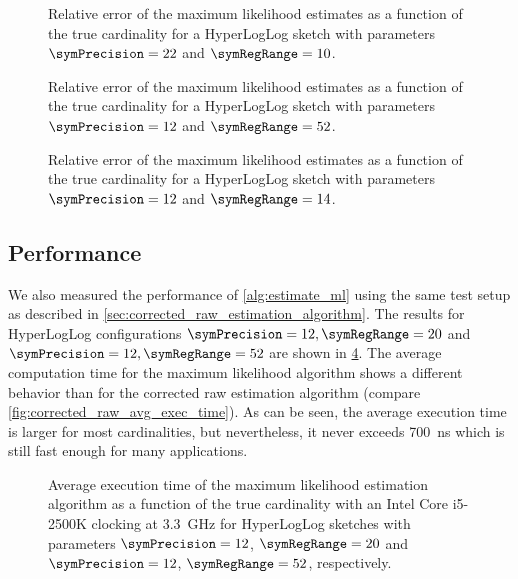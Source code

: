 \documentclass[a4paper]{scrartcl}
\begin{document}
\begin{figure}
\centering

\caption{Relative error of the maximum likelihood estimates as a function of the true cardinality for a HyperLogLog sketch with parameters $\symPrecision = 22$ and $\symRegRange=10$.}
\label{fig:max_likelihood_estimation_error_22_10}
\end{figure}

\begin{figure}
\centering

\caption{Relative error of the maximum likelihood estimates as a function of the true cardinality for a HyperLogLog sketch with parameters $\symPrecision = 12$ and $\symRegRange=52$.}
\label{fig:max_likelihood_estimation_error_12_52}
\end{figure}

\begin{figure}
\centering

\caption{Relative error of the maximum likelihood estimates as a function of the true cardinality for a HyperLogLog sketch with parameters $\symPrecision = 12$ and $\symRegRange=14$.}
\label{fig:max_likelihood_estimation_error_12_14}
\end{figure}

\subsection{Performance}
We also measured the performance of \cref{alg:estimate_ml} using the same test setup as described in \cref{sec:corrected_raw_estimation_algorithm}. The results for HyperLogLog configurations $\symPrecision=12, \symRegRange=20$ and $\symPrecision=12, \symRegRange=52$ are shown in \cref{fig:avg_exec_time}. The average computation time for the maximum likelihood algorithm shows a different behavior than for the corrected raw estimation algorithm (compare \cref{fig:corrected_raw_avg_exec_time}). As can be seen, the average execution time is larger for most cardinalities, but nevertheless, it never exceeds \SI{700}{\nano\second} which is still fast enough for many applications.

\begin{figure}
\centering

\caption{Average execution time of the maximum likelihood estimation algorithm as a function of the true cardinality with an Intel Core i5-2500K clocking at \SI{3.3}{\giga\hertz} for HyperLogLog sketches with parameters $\symPrecision=12$, $\symRegRange=20$ and $\symPrecision=12$, $\symRegRange=52$, respectively.}
\label{fig:avg_exec_time}
\end{figure}
\end{document}
